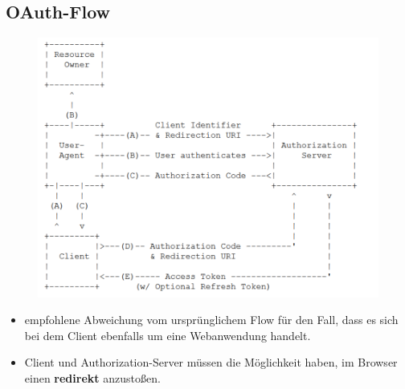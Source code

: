 \subsection{OAuth-Flow}
\begin{figure}[H]
	\begin{center}
		\includegraphics[scale=0.8]{Resources/OAuthFlow}
		\caption{}
		\label{fig:OAuthFlow}
	\end{center}
\end{figure}
\begin{itemize}
	\item empfohlene Abweichung vom ursprünglichem Flow für den Fall, dass es sich bei dem Client ebenfalls um eine Webanwendung handelt.
	\item Client und Authorization-Server müssen die Möglichkeit haben, im Browser einen \textbf{redirekt} anzustoßen.
\end{itemize}
























